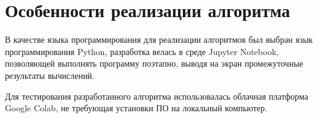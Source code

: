 \chapter{Особенности реализации алгоритма}


В качестве языка программирования для реализации алгоритмов был выбран язык программирования Python, разработка велась в среде Jupyter Notebook, позволяющей выполнять программу поэтапно, выводя на экран промежуточные результаты вычислений.

Для тестирования разработанного алгоритма использовалась облачная платформа Google Colab, не требующая установки ПО на локальный компьютер.

\clearpage
